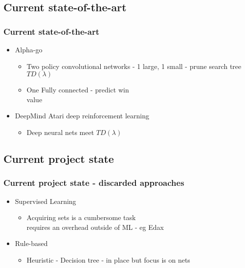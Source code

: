 \documentclass{beamer}
\begin{document}
\subsection{Current state-of-the-art}
\begin{frame}
\frametitle{Current state-of-the-art}
\begin{itemize}
\item<1->Alpha-go
\begin{itemize}
\item<2,3>Two policy convolutional networks - 1 large, 1  small - prune search tree\\$TD(\lambda)$
\item<3>One Fully connected - predict win\\value
\end{itemize}
\item<4->DeepMind Atari deep reinforcement learning
\begin{itemize}
\item<5>Deep neural nets meet $TD(\lambda)$
\end{itemize}
\end{itemize}
\end{frame}

\subsection{Current project state}
\begin{frame}
\frametitle{Current project state - discarded approaches}
\begin{itemize}
\item<1->Supervised Learning
\begin{itemize}
\item<2>Acquiring sets is a cumbersome task\\ requires an overhead outside of ML - eg Edax
\end{itemize}
\item<3->Rule-based
\begin{itemize}
\item<4>Heuristic - Decision tree - in place but focus is on nets
\end{itemize}
\end{itemize}

\end{frame}
\end{document}
